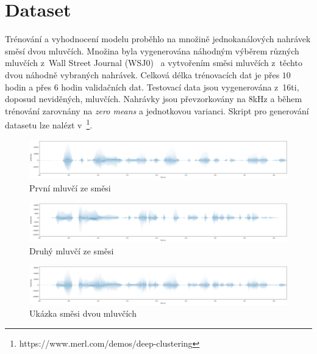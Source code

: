 \section{Dataset}

Trénování a vyhodnocení modelu proběhlo na množině jednokanálových nahrávek směsí dvou mluvčích. Množina byla vygenerována náhodným výběrem různých mluvčích z~Wall Street Journal (WSJ0)~\cite{DBLP-dataset} a vytvořením směsi mluvčích z~těchto dvou náhodně vybraných nahrávek. Celková délka trénovacích dat je přes $10$ hodin a přes $6$ hodin validačních dat. Testovací data jsou vygenerována z~16ti, doposud neviděných, mluvčích. Nahrávky jsou převzorkovány na 8kHz a během trénování zarovnány na \textit{zero means} a jednotkovou varianci. Skript pro generování datasetu lze nalézt v~\footnote{https://www.merl.com/demos/deep-clustering}.

\begin{figure}[H]
    \centering
    \includegraphics[scale=0.24]{obrazky-figures/s1.png}
    \caption{\label{fig:ref-s1}První mluvčí ze směsi}
\end{figure}

\begin{figure}[H]
    \centering
    \includegraphics[scale=0.24]{obrazky-figures/s2.png}
    \caption{\label{fig:ref-s2}Druhý mluvčí ze směsi}
\end{figure}

\begin{figure}[H]
    \centering
    \includegraphics[scale=0.24]{obrazky-figures/mix.png}
    \caption{\label{fig:ref-mixture}Ukázka směsi dvou mluvčích}
\end{figure}

